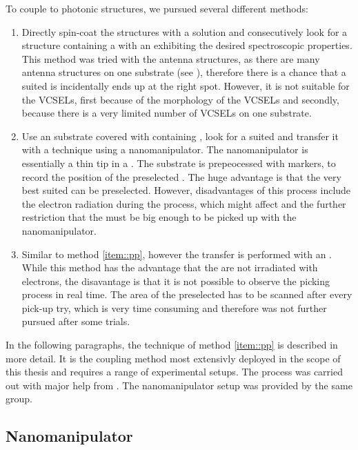 	To couple \nds to photonic structures, we pursued several different methods:
	\begin{enumerate}
		\item Directly spin-coat the structures with a \nd solution and consecutively look for a structure containing a \nds with an \siv exhibiting the desired spectroscopic properties. This method was tried with the antenna structures, as there are many antenna structures on one substrate (see ), therefore there is a chance that a suited \nd is incidentally ends up at the right spot. However, it is not suitable for the VCSELs, first because of the morphology of the VCSELs and secondly, because there is a very limited number of VCSELs on one substrate.
		\item \label{item::pp}Use an \ir substrate covered with \nds containing \sivs, look for a suited \nd and transfer it with a \pp technique using a nanomanipulator. The nanomanipulator is essentially a thin tip in a \sem. The \ir substrate is prepeocessed with markers, to record the position of the preselected \nd. The huge advantage is that the very best suited \nd can be preselected. However, disadvantages of this process include the electron radiation during the \pp process, which might affect \siv \fl and the further restriction that the \nds must be big enough to be picked up with the nanomanipulator.
		\item Similar to method \ref{item::pp}, however the transfer is performed with an \afm. While this method has the advantage that the \nds are not irradiated with electrons, the disavantage is that it is not possible to  observe the picking process in real time. The area of the preselected \nd has to be scanned after every pick-up try, which is very time consuming and therefore was not further pursued after some trials.
	\end{enumerate}

	In the following paragraphs, the \pp technique of method \ref{item::pp} is described in more detail.
	It is the coupling method most extensivly deployed in the scope of this thesis and requires a range of experimental setups.
	The \pp process was carried out with major help from \pauly.
	The nanomanipulator setup was provided by the same group.
	\\
	\subsection{Nanomanipulator} \label{subsec::nanomanipulator}

